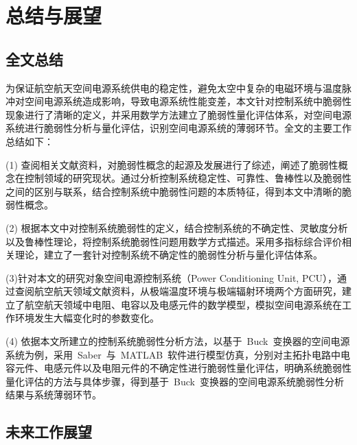 \chapter{总结与展望}
\label{cha:Sum}
\section{全文总结}
\label{sec:chap6:Sum}

为保证航空航天空间电源系统供电的稳定性，避免太空中复杂的电磁环境与温度脉冲对空间电源系统造成影响，导致电源系统性能变差，本文针对控制系统中脆弱性现象进行了清晰的定义，并采用数学方法建立了脆弱性量化评估体系，对空间电源系统进行脆弱性分析与量化评估，识别空间电源系统的薄弱环节。全文的主要工作总结如下：

(1) 查阅相关文献资料，对脆弱性概念的起源及发展进行了综述，阐述了脆弱性概念在控制领域的研究现状。通过分析控制系统稳定性、可靠性、鲁棒性以及脆弱性之间的区别与联系，结合控制系统中脆弱性问题的本质特征，得到本文中清晰的脆弱性概念。

(2) 根据本文中对控制系统脆弱性的定义，结合控制系统的不确定性、灵敏度分析以及鲁棒性理论，将控制系统脆弱性问题用数学方式描述。采用多指标综合评价相关理论，建立了一套针对控制系统不确定性的脆弱性分析与量化评估体系。

(3)针对本文的研究对象空间电源控制系统（Power Conditioning Unit, PCU），通过查阅航空航天领域文献资料，从极端温度环境与极端辐射环境两个方面研究，建立了航空航天领域中电阻、电容以及电感元件的数学模型，模拟空间电源系统在工作环境发生大幅变化时的参数变化。

(4) 依据本文所建立的控制系统脆弱性分析方法，以基于~Buck~变换器的空间电源系统为例，采用~Saber~与~MATLAB~软件进行模型仿真，分别对主拓扑电路中电容元件、电感元件以及电阻元件的不确定性进行脆弱性量化评估，明确系统脆弱性量化评估的方法与具体步骤，得到基于~Buck~变换器的空间电源系统脆弱性分析结果与系统薄弱环节。




%



\section{未来工作展望}
\label{sec:chap6:Future}

